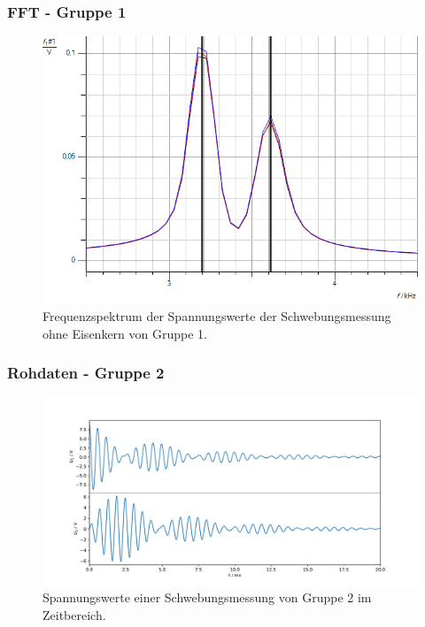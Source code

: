 \documentclass{beamer}
\begin{document}
\begin{frame}
\frametitle{FFT - Gruppe 1}
\begin{figure}
\includegraphics[width = .65\framewidth]{abbildungen/plotsLC/FFTFehler.png}
\caption{Frequenzspektrum der Spannungswerte der Schwebungsmessung ohne Eisenkern von Gruppe 1.}
\end{figure}
\end{frame}

\begin{frame}
\frametitle{Rohdaten - Gruppe 2}
\begin{figure}
\includegraphics[width = \framewidth]{abbildungen/plotsLC/schwebung_roh.pdf}
\caption{Spannungswerte einer Schwebungsmessung von Gruppe 2 im Zeitbereich.}
\end{figure}
\end{frame}
\end{document}
